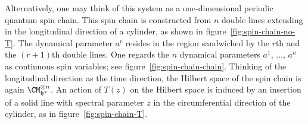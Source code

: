 Alternatively, one may think of this system as a one-dimensional
periodic quantum spin chain.  This spin chain is constructed from $n$
double lines extending in the longitudinal direction of a cylinder, as
shown in figure~\ref{fig:spin-chain-no-T}.  The dynamical parameter
$a^r$ resides in the region sandwiched by the $r$th and the
$(r+1)$th double lines.  One regards the $n$ dynamical parameters
$a^1$, $\dotsc$, $a^n$ as continuous spin variables; see
figure~\ref{fig:spin-chain-chain}.  Thinking of the longitudinal
direction as the time direction, the Hilbert space of the spin chain
is again $\CM_{\hf^*}^{\otimes n}$.  An action of $T(z)$ on the
Hilbert space is induced by an insertion of a solid line with spectral
parameter $z$ in the circumferential direction of the cylinder, as in
figure~\ref{fig:spin-chain-T}.

